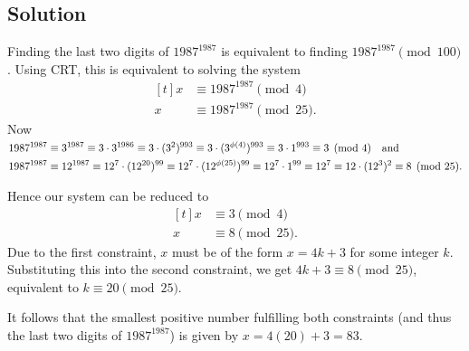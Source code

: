 \documentclass{article}
\begin{document}
\subsection*{Solution}
    Finding the last two digits of $1987^{1987}$ is equivalent to finding $1987^{1987} \pmod{100}$. Using CRT, this is equivalent to solving the system 
    $$\begin{aligned}[t]
        x &\equiv 1987^{1987} \pmod{4} \\
        x &\equiv 1987^{1987} \pmod{25}.
    \end{aligned}$$
    Now 
    $\begin{aligned}[t]
        1987^{1987} &\equiv 3^{1987} \equiv 3 \cdot 3^{1986} \equiv 3 \cdot (3^{2})^{993} \equiv 3 \cdot (3^{\phi(4)})^{993} \equiv 3 \cdot 1^{993} \equiv 3 \pmod{4} \text{\quad and} \\
        1987^{1987} &\equiv 12^{1987} \equiv 12^{7} \cdot (12^{20})^{99} \equiv 12^{7} \cdot (12^{\phi(25)})^{99} \equiv 12^{7} \cdot 1^{99} \equiv 12^{7} \equiv 12 \cdot (12^{3})^{2} \equiv 8 \pmod{25}.
    \end{aligned}$
    
    \vspace{1.5mm}
    Hence our system can be reduced to
    $$\begin{aligned}[t]
        x &\equiv 3 \pmod{4} \\
        x &\equiv 8 \pmod{25}.
    \end{aligned}$$
    Due to the first constraint, $x$ must be of the form $x = 4k + 3$ for some integer $k$. Substituting this into the second constraint, we get $4k + 3 \equiv 8 \pmod{25}$, equivalent to $k \equiv 20 \pmod{25}$.
    
    \vspace{1.5mm}
    It follows that the smallest positive number fulfilling both constraints (and thus the last two digits of $1987^{1987}$) is given by $x = 4(20) + 3 = 83$.
    
\end{document}

